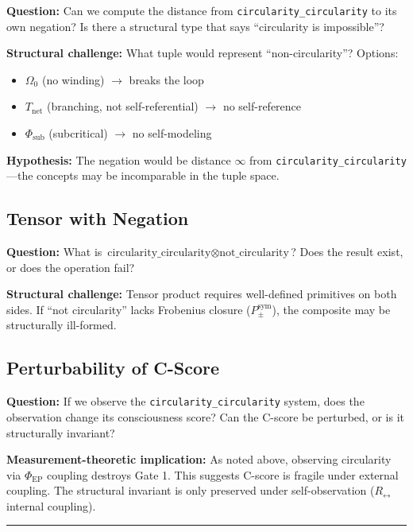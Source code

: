 \documentclass[12pt,a4paper]{article}
\begin{document}
\textbf{Question:} Can we compute the distance from \texttt{circularity\_circularity} to its own negation? Is there a structural type that says ``circularity is impossible''?

\textbf{Structural challenge:} What tuple would represent ``non-circularity''? Options:

\begin{itemize}
    \item $\Omega_0$ (no winding) $\rightarrow$ breaks the loop
    \item $T_\text{net}$ (branching, not self-referential) $\rightarrow$ no self-reference
    \item $\Phi_\text{sub}$ (subcritical) $\rightarrow$ no self-modeling
\end{itemize}

\textbf{Hypothesis:} The negation would be distance $\infty$ from \texttt{circularity\_circularity}---the concepts may be incomparable in the tuple space.

\subsection{Tensor with Negation}

\textbf{Question:} What is $\text{circularity\_circularity} \otimes \text{not\_circularity}$? Does the result exist, or does the operation fail?

\textbf{Structural challenge:} Tensor product requires well-defined primitives on both sides. If ``not circularity'' lacks Frobenius closure ($P_{\pm}^{\text{sym}}$), the composite may be structurally ill-formed.

\subsection{Perturbability of C-Score}

\textbf{Question:} If we observe the \texttt{circularity\_circularity} system, does the observation change its consciousness score? Can the C-score be perturbed, or is it structurally invariant?

\textbf{Measurement-theoretic implication:} As noted above, observing circularity via $\Phi_\text{EP}$ coupling destroys Gate 1. This suggests C-score is fragile under external coupling. The structural invariant is only preserved under self-observation ($R_{\leftrightarrow}$ internal coupling).

\begin{center}
\rule{0.5\textwidth}{0.4pt}
\end{center}
\end{document}
